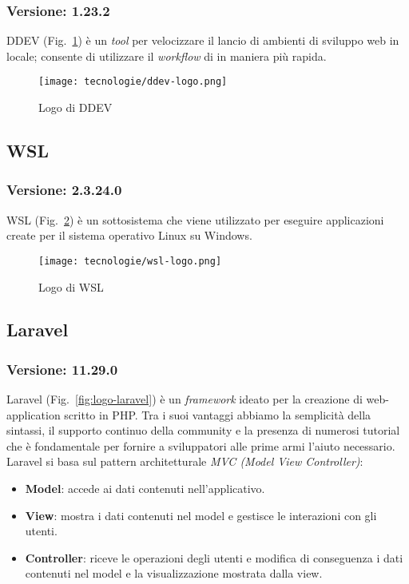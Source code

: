 \subsubsection{Versione: 1.23.2}
DDEV (Fig.~\ref{fig:logo-ddev}) è un \emph{tool} per velocizzare il lancio di ambienti di sviluppo web in locale; consente di utilizzare il \emph{workflow} di  in maniera più rapida.

\begin{figure}[!h] 
  \centering 
  \texttt{[image: tecnologie/ddev-logo.png]} 
  \caption{Logo di DDEV}
  \label{fig:logo-ddev}
\end{figure}

\newpage

\subsection{\label{tec:wsl}WSL}
\subsubsection{Versione: 2.3.24.0}
WSL (Fig.~\ref{fig:logo-wsl}) è un sottosistema che viene utilizzato per eseguire applicazioni create per il sistema operativo Linux su Windows.

\begin{figure}[!h] 
  \centering 
  \texttt{[image: tecnologie/wsl-logo.png]} 
  \caption{Logo di WSL}
  \label{fig:logo-wsl}
\end{figure}

\subsection{\label{tec:Laravel}Laravel}
\subsubsection{Versione: 11.29.0}
Laravel (Fig.~\ref{fig:logo-laravel}) è un \emph{framework} ideato per la creazione di web-application scritto in PHP.
Tra i suoi vantaggi abbiamo la semplicità della sintassi, il supporto continuo della community e la presenza di numerosi tutorial che è fondamentale per fornire a sviluppatori alle prime armi l'aiuto necessario.
Laravel si basa sul pattern architetturale \emph{MVC (Model View Controller)}:
\begin{itemize}
  \item \textbf{Model}: accede ai dati contenuti nell'applicativo.
  \item \textbf{View}: mostra i dati contenuti nel model e gestisce le interazioni con gli utenti.  
  \item \textbf{Controller}: riceve le operazioni degli utenti e modifica di conseguenza i dati contenuti nel model e la visualizzazione mostrata dalla view.
\end{itemize}

